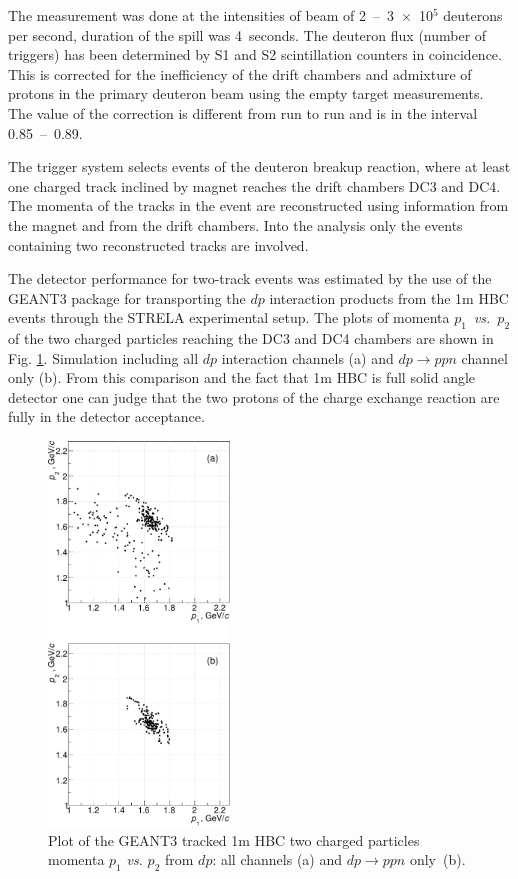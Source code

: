 \documentclass[twocolumn,epjc3]{svjour3}
\newcommand{\dpfrag} {\ensuremath{dp \rightarrow ppn}\xspace}
\begin{document}
The measurement was done at the intensities of beam of 2~--~3~$\times$~10$^5$
deuterons per second, duration of the spill was 4~seconds. The deuteron flux
(number of triggers) has been determined by S1 and S2 scintillation counters in
coincidence. This is corrected for the inefficiency of the drift chambers and
admixture of protons in the primary deuteron beam using the empty target
measurements. The value of the correction is different from run to run and is in
the interval 0.85~--~0.89.

The trigger system selects events of the deuteron breakup reaction, where at
least one charged track inclined by magnet reaches the drift chambers DC3 and
DC4. The momenta of the tracks in the event are reconstructed using information
from the magnet and from the drift chambers. Into the analy\-sis only the events
containing two reconstructed tracks are involved.

The detector performance for two-track events was estimated by the use of the
GEANT3 package for transporting the $dp$ interaction products from the 1m HBC
events through the STRELA experimental setup. The plots of momenta
$p_1$~\textit{vs.}~$p_2$ of the two charged particles reaching the DC3 and DC4
chambers are shown in Fig. \ref{fig:p1vsp2_sim}. Simulation including all $dp$
interaction channels (a) and \dpfrag channel only (b). From this comparison and
the fact that 1m HBC is full solid angle detector one can judge that the two
protons of the charge exchange reaction are fully in the detector acceptance.

\begin{figure}[t]
  \centering
  \includegraphics[width=0.43\textwidth]{p1_vs_p2_1.pdf} %
  \caption{Plot of the GEANT3 tracked 1m HBC two charged particles momenta
    $p_1$ \textit{vs.} $p_2$ from $dp$: all channels (a) and \dpfrag only~(b).}
  \label{fig:p1vsp2_sim}
\end{figure}
\end{document}
